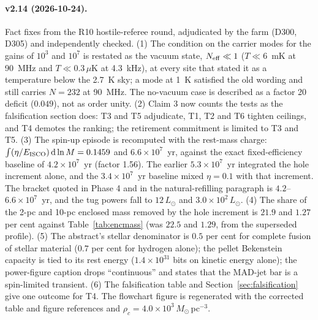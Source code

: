 \documentclass[11pt]{article}
\newcommand{\msun}{\ensuremath{M_\odot}}
\begin{document}
\paragraph{v2.14 (2026-10-24).} Fact fixes from the R10 hostile-referee round, adjudicated by the farm (D300, D305) and independently checked. (1) The condition on the carrier modes for the gains of $10^{3}$ and $10^{7}$ is restated as the vacuum state, $N_{\rm eff}\ll1$ ($T\ll6$~mK at 90~MHz and $T\ll0.3\,\mu$K at 4.3~kHz), at every site that stated it as a temperature below the 2.7~K sky; a mode at 1~K satisfied the old wording and still carries $N = 232$ at 90~MHz. The no-vacuum case is described as a factor 20 deficit ($0.049$), not as order unity. (2) Claim 3 now counts the tests as the falsification section does: T3 and T5 adjudicate, T1, T2 and T6 tighten ceilings, and T4 demotes the ranking; the retirement commitment is limited to T3 and T5. (3) The spin-up episode is recomputed with the rest-mass charge: $\int(\eta/E_{\rm ISCO})\,\mathrm{d}\ln M = 0.1459$ and $6.6\times10^{7}$~yr, against the exact fixed-efficiency baseline of $4.2\times10^{7}$~yr (factor 1.56). The earlier $5.3\times10^{7}$~yr integrated the hole increment alone, and the $3.4\times10^{7}$~yr baseline mixed $\eta = 0.1$ with that increment. The bracket quoted in Phase 4 and in the natural-refilling paragraph is $4.2$--$6.6\times10^{7}$~yr, and the tug powers fall to $12\,L_\odot$ and $3.0\times10^{2}\,L_\odot$. (4) The share of the 2-pc and 10-pc enclosed mass removed by the hole increment is $21.9$ and $1.27$ per cent against Table~\ref{tab:encmass} (was $22.5$ and $1.29$, from the superseded profile). (5) The abstract's stellar denominator is $0.5$ per cent for complete fusion of stellar material ($0.7$ per cent for hydrogen alone); the pellet Bekenstein capacity is tied to its rest energy ($1.4\times10^{31}$ bits on kinetic energy alone); the power-figure caption drops ``continuous'' and states that the MAD-jet bar is a spin-limited transient. (6) The falsification table and Section~\ref{sec:falsification} give one outcome for T4. The flowchart figure is regenerated with the corrected table and figure references and $\rho_c = 4.0\times10^{3}\,\msun$\,pc$^{-3}$.
\end{document}
